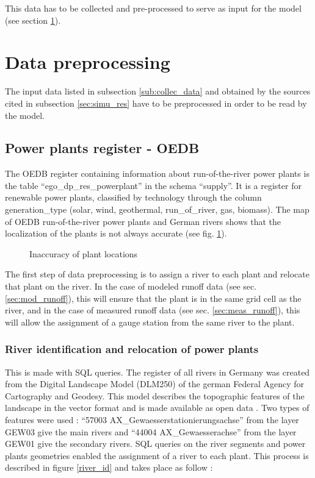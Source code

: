 This data has to be collected and pre-processed to serve as input for the model (see section \ref{sec:data_preproc}).

\section{Data preprocessing}
\label{sec:data_preproc}
The input data listed in subsection \ref{sub:collec_data} and obtained by the sources cited in subsection \ref{sec:simu_res} have to be preprocessed in order to be read by the model.

\subsection{Power plants register - OEDB}

The OEDB register containing information about run-of-the-river power plants is the table ``ego{\_}dp{\_}res{\_}powerplant'' in the schema ``supply''. It is a register for renewable power plants, classified by technology through the column generation{\_}type (solar, wind, geothermal, run{\_}of{\_}river, gas, biomass). \newline 
The map of OEDB run-of-the-river power plants and German rivers shows that the localization of the plants is not always accurate (see fig. \ref{pp_river_dist}).
\begin{figure}[H]
\center
{}
\caption{Inaccuracy of plant locations}
\label{pp_river_dist}
\end{figure}
The first step of data preprocessing is to assign a river to each plant and relocate that plant on the river. \newline
In the case of modeled runoff data (see sec. \ref{sec:mod_runoff}), this will ensure that the plant is in the same grid cell as the river, and in the case of measured runoff data (see sec. \ref{sec:meas_runoff}), this will allow the assignment of a gauge station from the same river to the plant.


\subsubsection*{River identification and relocation of power plants}

This is made with SQL queries. The register of all rivers in Germany was created from the Digital Landscape Model (DLM250) of the german Federal Agency for Cartography and Geodesy. This model describes the topographic features of the landscape in the vector format and is made available as open data \cite{dlm250}. \newline Two types of features were used : ``57003 AX{\_}Gewaesserstationierungsachse'' from the layer GEW03 give the main rivers and ``44004 AX{\_}Gewaesserachse'' from the layer GEW01 give the secondary rivers. \newline 
SQL queries on the river segments and power plants geometries enabled the assignment of a river to each plant. This process is described in figure \ref{river_id} and takes place as follow : 

